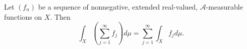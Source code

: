 Let $(f_n)$ be a sequence of nonnegative, extended real-valued, $\mathcal{A}$-measurable functions on $X$. Then $$\int_X \left( \sum_{j=1}^{\infty} f_j \right) d\mu = \sum_{j=1}^{\infty} \int_X f_j d\mu.$$
